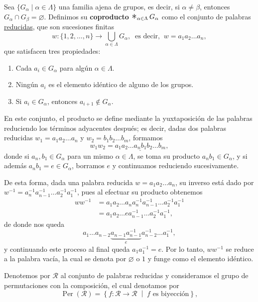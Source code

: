 \begin{definicion}
Sea $\{G_\alpha \mid \alpha \in \Lambda\}$ una familia ajena de grupos, es decir, si $\alpha \neq \beta$, entonces $G_\alpha \cap G_\beta = \varnothing$. Definimos su \textbf{coproducto} $\mathop{\scalebox{1.5}{$\ast$}}_{\alpha \in \Lambda} G_\alpha$ como el conjunto de palabras \underline{reducidas}, que son sucesiones finitas
\[
w \colon \{1, 2, \dots, n\} \longrightarrow \bigcup_{\alpha \in \Lambda} G_\alpha, \;\; \text{es decir,} \;\; w = a_1 a_2 \dots a_n,
\]
que satisfacen tres propiedades:
\begin{enumerate}
    \item Cada $a_i \in G_\alpha$ para algún $\alpha \in \Lambda$.
    \item Ningún $a_i$ es el elemento idéntico de alguno de los grupos.
    \item Si $a_i \in G_\alpha$, entonces $a_{i+1} \notin G_\alpha$.
\end{enumerate}

En este conjunto, el producto se define mediante la yuxtaposición de las palabras reduciendo los términos adyacentes después; es decir, dadas dos palabras reducidas $w_1 = a_1 a_2 \dots a_n$ y $w_2 = b_1 b_2 \dots b_m$, formamos
\[
w_1 w_2 = a_1 a_2 \dots \underline{a_n b_1} b_2 \dots b_m,
\]
donde si $a_n, b_1 \in G_\alpha$ para un mismo $\alpha \in \Lambda$, se toma su producto $a_n b_1 \in G_\alpha$, y si además $a_n b_1 = e \in G_\alpha$, borramos $e$ y continuamos reduciendo sucesivamente.

De esta forma, dada una palabra reducida $w = a_1 a_2 \dots a_n$, su inverso está dado por $w^{-1} = a_n^{-1} a_{n-1}^{-1} \dots a_2^{-1} a_1^{-1}$, pues al efectuar su producto obtenemos
\begin{align*}
    w w^{-1} &= a_1 a_2 \dots {a_n a_n^{-1}} a_{n-1}^{-1} \dots a_2^{-1} a_1^{-1}\\
    & = a_1 a_2 \dots e a_{n-1}^{-1} \dots a_2^{-1} a_1^{-1},
\end{align*}
de donde nos queda 
\[
a_1 \dots a_{n-2} \underbrace{a_{n-1} a_{n-1}^{-1}}_{e} a_{n-2}^{-1} \dots a_1^{-1},
\]
y continuando este proceso al final queda $a_1 a_1^{-1} = e$. Por lo tanto, $w w^{-1}$ se reduce a la palabra vacía, la cual se denota por $\varnothing$ o $1$ y funge como el elemento idéntico.
\end{definicion}
\begin{definicion}
    Denotemos por $\mathcal{R}$ al conjunto de palabras reducidas y consideramos el grupo de permutaciones con la composición, el cual denotamos por
\[
\operatorname{Per}(\mathcal{R}) = \left\{ f \colon \mathcal{R} \to \mathcal{R} \;\middle|\; f \text{ es biyección} \right\},
\]
\end{definicion}

